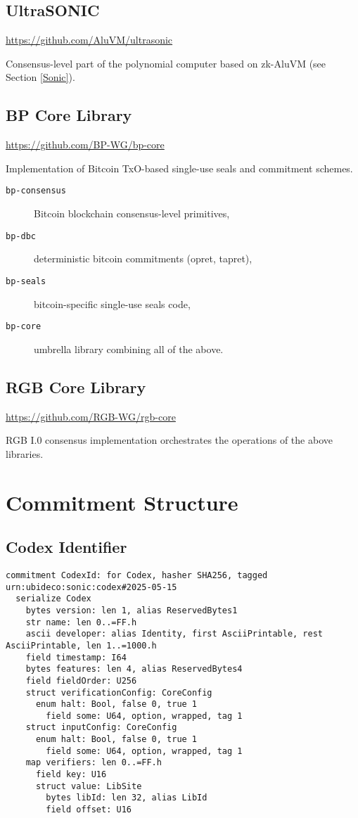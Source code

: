\documentclass[9pt,oneside]{amsart}
\begin{document}
\subsection{UltraSONIC}

\url{https://github.com/AluVM/ultrasonic}

Consensus-level part of the polynomial computer based on zk-AluVM (see Section \ref{Sonic}).

\subsection{BP Core Library}
    
\url{https://github.com/BP-WG/bp-core}

Implementation of Bitcoin TxO-based single-use seals and commitment schemes.

\begin{description}
    \item[\texttt{bp-consensus}]  Bitcoin blockchain consensus-level primitives,
    \item[\texttt{bp-dbc}] deterministic bitcoin commitments (opret, tapret),
    \item[\texttt{bp-seals}] bitcoin-specific single-use seals code,
    \item[\texttt{bp-core}] umbrella library combining all of the above.
\end{description}

\subsection{RGB Core Library}

\url{https://github.com/RGB-WG/rgb-core}

RGB I.0 consensus implementation orchestrates the operations of the above libraries.


\newpage
\section{Commitment Structure}\label{ap:Commitments}

\subsection{Codex Identifier}\label{ap:CodexId}

\begin{verbatim}
commitment CodexId: for Codex, hasher SHA256, tagged urn:ubideco:sonic:codex#2025-05-15 
  serialize Codex
    bytes version: len 1, alias ReservedBytes1 
    str name: len 0..=FF.h 
    ascii developer: alias Identity, first AsciiPrintable, rest AsciiPrintable, len 1..=1000.h 
    field timestamp: I64 
    bytes features: len 4, alias ReservedBytes4 
    field fieldOrder: U256 
    struct verificationConfig: CoreConfig 
      enum halt: Bool, false 0, true 1 
        field some: U64, option, wrapped, tag 1 
    struct inputConfig: CoreConfig 
      enum halt: Bool, false 0, true 1 
        field some: U64, option, wrapped, tag 1 
    map verifiers: len 0..=FF.h 
      field key: U16 
      struct value: LibSite 
        bytes libId: len 32, alias LibId 
        field offset: U16 
\end{verbatim}
\end{document}

